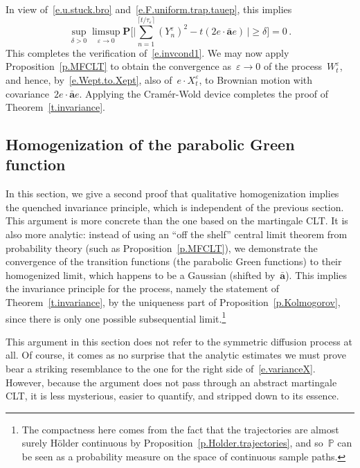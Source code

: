 \documentclass[11pt,twoside]{article} %
\numberwithin{equation}{section}
\theoremstyle{definition}
\newcommand{\eps}{\varepsilon}
\newcommand{\ep}{\eps}
\renewcommand{\a}{\mathbf{a}}
\newcommand{\ahom}{\bar{\a}}
\renewcommand{\P}{\mathbb{P}}
\begin{document}
In view of~\eqref{e.u.stuck.bro} and~\eqref{e.F.uniform.trap.tauep}, 
this implies 
\begin{equation*}
\sup_{\delta>0}
\limsup_{\ep \to 0} 
\mathbf{P} 
\Biggl[ 
\biggl| 
\sum_{n=1}^{\lceil t/\tau_\ep \rceil} 
(Y^\ep_n)^2 
-
t (2 e\cdot \ahom e) 
\,
\biggr|
\geq \delta 
\Biggr]
= 0\,.
\end{equation*}
This completes the verification of~\eqref{e.invcond1}. 
We may now apply Proposition~\ref{p.MFCLT} to obtain the convergence as~$\ep\to0$ of the process~$W^\ep_t$, and hence, by~\eqref{e.Wept.to.Xept}, also of~$e\cdot X^\ep_t$, to Brownian motion with covariance~$2e\cdot \ahom e$. Applying the Cram\'er-Wold device completes the proof of Theorem~\ref{t.invariance}. 



\subsection{Homogenization of the parabolic Green function}
\label{ss.Green}

In this section, we give a second proof that qualitative homogenization implies the quenched invariance principle, which is independent of the previous section. This argument is more concrete than the one based on the martingale CLT. It is also more analytic: instead of using an ``off the shelf'' central limit theorem from probability theory (such as Proposition~\ref{p.MFCLT}), we demonstrate the convergence of the transition functions (the parabolic Green functions) to their homogenized limit, which happens to be a Gaussian (shifted by~$\ahom$). This implies the invariance principle for the process, namely the statement of Theorem~\ref{t.invariance}, by the uniqueness part of Proposition~\ref{p.Kolmogorov}, since there is only one possible subsequential limit.\footnote{The compactness here comes from the fact that the trajectories are almost surely H\"older continuous by Proposition~\ref{p.Holder.trajectories}, and so~$\P$ can be seen as a probability measure on the space of continuous sample paths.}

\smallskip

This argument in this section does not refer to the symmetric diffusion process at all. Of course, it comes as no surprise that the analytic estimates we must prove bear a striking resemblance to the one for the right side of~\eqref{e.varianceX}. However, because the argument does not pass through an abstract martingale CLT, it is less mysterious, easier to quantify, and stripped down to its essence. 
\end{document}
